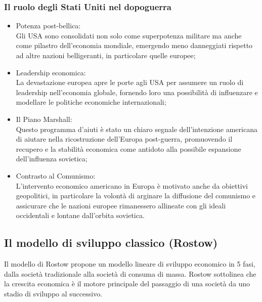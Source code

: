 \documentclass{article}
\begin{document}
\subsubsection{Il ruolo degli Stati Uniti nel dopoguerra}
\begin{itemize}
    \item Potenza post-bellica:\\
        Gli USA sono consolidati non solo come superpotenza militare ma anche come 
        pilastro dell’economia mondiale, emergendo meno danneggiati rispetto ad altre 
        nazioni belligeranti, in particolare quelle europee;
    \item Leadership economica:\\
        La devastazione europea apre le porte agli USA per assumere un ruolo di 
        leadership nell’economia globale, fornendo loro una possibilità di influenzare e 
        modellare le politiche economiche internazionali;
    \item Il Piano Marshall:\\
        Questo programma d’aiuti è stato un chiaro segnale dell’intenzione americana di 
        aiutare nella ricostruzione dell’Europa post-guerra, promuovendo il recupero e la 
        stabilità economica come antidoto alla possibile espansione dell’influenza sovietica;
    \item Contrasto al Comunismo:\\
        L’intervento economico americano in Europa è motivato anche da obiettivi 
        geopolitici, in particolare la volontà di arginare la diffusione del comunismo e 
        assicurare che le nazioni europee rimanessero allineate con gli ideali occidentali e 
        lontane dall’orbita sovietica.
\end{itemize}

\subsection{Il modello di sviluppo classico (Rostow)}
Il modello di Rostow propone un modello lineare di sviluppo economico in 5 fasi, dalla 
società tradizionale alla società di consuma di massa. Rostow sottolinea che la crescita
economica è il motore principale del passaggio di una società da uno stadio di sviluppo al
successivo.
\end{document}
